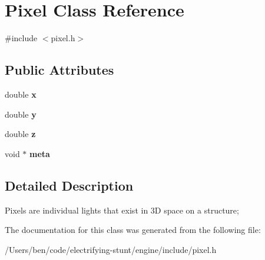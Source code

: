 \hypertarget{class_pixel}{}\section{Pixel Class Reference}
\label{class_pixel}


{\ttfamily \#include $<$pixel.\+h$>$}

\subsection*{Public Attributes}
\begin{DoxyCompactItemize}
\item 
\hypertarget{class_pixel_a2850fc13bd8583b8b17c0e1771b5f42b}{}double {\bfseries x}\label{class_pixel_a2850fc13bd8583b8b17c0e1771b5f42b}

\item 
\hypertarget{class_pixel_a877a91968521f4ba2eb865950775ebf3}{}double {\bfseries y}\label{class_pixel_a877a91968521f4ba2eb865950775ebf3}

\item 
\hypertarget{class_pixel_aa6a0457c71e7ad5a6654bc95de8a3c37}{}double {\bfseries z}\label{class_pixel_aa6a0457c71e7ad5a6654bc95de8a3c37}

\item 
\hypertarget{class_pixel_af973ff7e209f6138ad82cad5f6fa93dc}{}void $\ast$ {\bfseries meta}\label{class_pixel_af973ff7e209f6138ad82cad5f6fa93dc}

\end{DoxyCompactItemize}


\subsection{Detailed Description}
Pixels are individual lights that exist in 3\+D space on a structure; 

The documentation for this class was generated from the following file\+:\begin{DoxyCompactItemize}
\item 
/\+Users/ben/code/electrifying-\/stunt/engine/include/pixel.\+h\end{DoxyCompactItemize}
